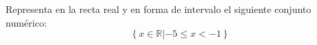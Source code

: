 \documentclass[addpoints,spanish, 12pt,a4paper]{exam}
\begin{document}
\begin{questions}





\question[1] Representa en la recta real y en forma de intervalo el siguiente conjunto numérico:
\addpoints %
$$\left\{ x \in \mathbb{R} \left| -5 \leqslant x < -1 \right. \right\}$$

\begin{solution}
$ $ 
\end{solution}


\addpoints

\end{questions}
\end{document}
